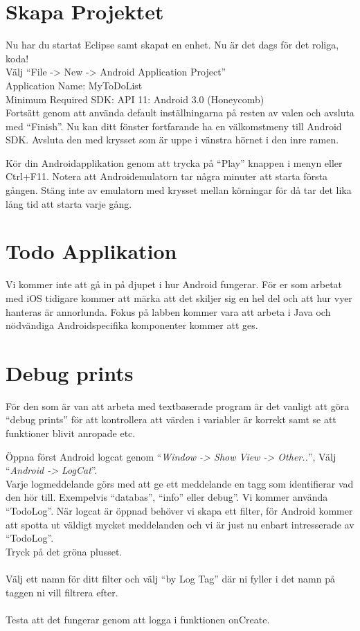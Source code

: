 \documentclass[11 pt]{article} %
\begin{document}
\section{Skapa Projektet}
Nu har du startat Eclipse samt skapat en enhet. 
Nu är det dags för det roliga, koda!\\

Välj “File -> New -> Android Application Project”\\ 
Application Name:  MyToDoList\\
Minimum Required SDK:  API 11: Android 3.0 (Honeycomb)\\
Fortsätt genom att använda default inställningarna på resten av valen och avsluta med “Finish”. 
Nu kan ditt fönster fortfarande ha en välkomstmeny till Android SDK. 
Avsluta den med krysset som är uppe i vänstra hörnet i den inre ramen.

Kör din Androidapplikation genom att trycka på “Play” knappen i menyn eller Ctrl+F11. 
Notera att Androidemulatorn tar några minuter att starta första gången. 
Stäng inte av emulatorn med krysset mellan körningar för då tar det lika lång tid att starta varje gång.

\section{Todo Applikation}
Vi kommer inte att gå in på djupet i hur Android fungerar. 
För er som arbetat med iOS tidigare kommer att märka att det skiljer sig en hel del och att hur vyer hanteras är annorlunda. 
Fokus på labben kommer vara att arbeta i Java och nödvändiga Androidspecifika komponenter kommer att ges.
\section{Debug prints}
För den som är van att arbeta med textbaserade program är det vanligt att göra “debug prints” för att kontrollera att värden i variabler är korrekt samt se att funktioner blivit anropade etc.

Öppna först Android logcat genom “\textit{Window -> Show View -> Other..}”, Välj “\textit{Android -> LogCat}”.\\
Varje logmeddelande görs med att ge ett meddelande en tagg som identifierar vad den hör till. 
Exempelvis “databas”, “info” eller debug”. 
Vi kommer använda “TodoLog”. 
När logcat är öppnad behöver vi skapa ett filter, för Android kommer att spotta ut väldigt mycket meddelanden och vi är just nu enbart intresserade av “TodoLog”.\\ 
Tryck på det gröna plusset.\\ \\
Välj ett namn för ditt filter och välj “by Log Tag” där ni fyller i det namn på taggen ni vill filtrera efter.\\ \\
Testa att det fungerar genom att logga i funktionen onCreate.

\end{document}
